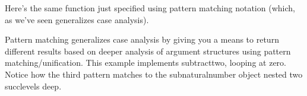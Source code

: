 \documentclass[letterpaper,10pt,english]{sphinxmanual}
\begin{document}
\begin{sphinxVerbatim}[commandchars=\\\{\}]
      
 
   
   
  

  
       
\end{sphinxVerbatim}

\sphinxAtStartPar
Here’s the same function just specified
using pattern matching notation (which,
as we’ve seen generalizes case analysis).

\begin{sphinxVerbatim}[commandchars=\\\{\}]
     
     
    

  
       
\end{sphinxVerbatim}

\sphinxAtStartPar
Pattern matching generalizes case analysis
by giving you a means to return different
results based on deeper analysis of argument
structures using pattern matching/unification.
This example implements subtract\sphinxhyphen{}two, looping
at zero. Notice how the third pattern matches
to the sub\sphinxhyphen{}natural\sphinxhyphen{}number object nested two
succ\sphinxhyphen{}levels deep.
\end{document}
